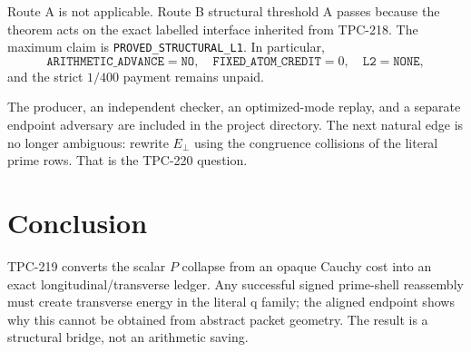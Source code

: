 \documentclass[11pt]{article}
\newcommand{\Eperp}{E_{\perp}}
\begin{document}
Route A is not applicable.  Route B structural threshold A passes because the theorem
acts on the exact labelled interface inherited from TPC-218.  The maximum claim is
\texttt{PROVED\_STRUCTURAL\_L1}.  In particular,
\[
 \texttt{ARITHMETIC\_ADVANCE}=\texttt{NO},\quad
 \texttt{FIXED\_ATOM\_CREDIT}=0,\quad
 \texttt{L2}=\texttt{NONE},
\]
and the strict $1/400$ payment remains unpaid.

The producer, an independent checker, an optimized-mode replay, and a separate endpoint
adversary are included in the project directory.  The next natural edge is no longer
ambiguous: rewrite $\Eperp$ using the congruence collisions of the literal prime rows.
That is the TPC-220 question.

\section{Conclusion}

TPC-219 converts the scalar $P$ collapse from an opaque Cauchy cost into an exact
longitudinal/transverse ledger.  Any successful signed prime-shell reassembly must create
transverse energy in the literal q family; the aligned endpoint shows why this cannot be
obtained from abstract packet geometry.  The result is a structural bridge, not an
arithmetic saving.



\end{document}
